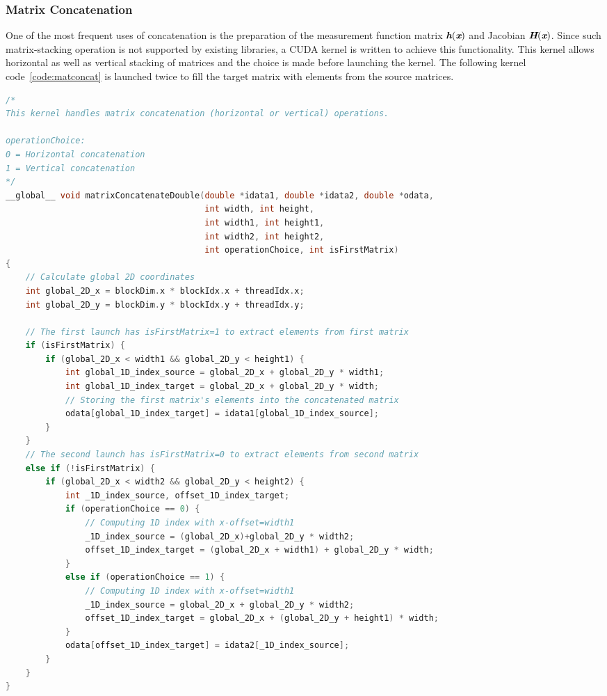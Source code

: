 \documentclass[thesis.tex]{subfiles}
\begin{document}
\subsubsection{Matrix Concatenation}
One of the most frequent uses of concatenation is the preparation of the measurement function matrix $\textit{\textbf{h}}(\textit{\textbf{x}})$ and Jacobian $\textit{\textbf{H}}(\textit{\textbf{x}})$. Since such matrix-stacking operation is not supported by existing libraries, a CUDA kernel is written to achieve this functionality. This kernel allows horizontal as well as vertical stacking of matrices and the choice is made before launching the kernel. The following kernel code~\ref{code:matconcat} is launched twice to fill the target matrix with elements from the source matrices.
\lstset{aboveskip=10pt,belowskip=10pt} %
\begin{lstlisting}[language=C, caption={CUDA kernel for matrix concatenation}, captionpos=b, label={code:matconcat}]
/*
This kernel handles matrix concatenation (horizontal or vertical) operations.

operationChoice:
0 = Horizontal concatenation
1 = Vertical concatenation
*/
__global__ void matrixConcatenateDouble(double *idata1, double *idata2, double *odata, 
										int width, int height, 
										int width1, int height1, 
										int width2, int height2, 
										int operationChoice, int isFirstMatrix)
{
	// Calculate global 2D coordinates
	int global_2D_x = blockDim.x * blockIdx.x + threadIdx.x;
	int global_2D_y = blockDim.y * blockIdx.y + threadIdx.y;
	
	// The first launch has isFirstMatrix=1 to extract elements from first matrix 
	if (isFirstMatrix) {
		if (global_2D_x < width1 && global_2D_y < height1) {
			int global_1D_index_source = global_2D_x + global_2D_y * width1;
			int global_1D_index_target = global_2D_x + global_2D_y * width;
			// Storing the first matrix's elements into the concatenated matrix
			odata[global_1D_index_target] = idata1[global_1D_index_source];
		}
	}
	// The second launch has isFirstMatrix=0 to extract elements from second matrix 
	else if (!isFirstMatrix) {
		if (global_2D_x < width2 && global_2D_y < height2) {
			int _1D_index_source, offset_1D_index_target;
			if (operationChoice == 0) {
				// Computing 1D index with x-offset=width1
				_1D_index_source = (global_2D_x)+global_2D_y * width2;
				offset_1D_index_target = (global_2D_x + width1) + global_2D_y * width;
			}
			else if (operationChoice == 1) {
				// Computing 1D index with x-offset=width1
				_1D_index_source = global_2D_x + global_2D_y * width2;
				offset_1D_index_target = global_2D_x + (global_2D_y + height1) * width;
			}
			odata[offset_1D_index_target] = idata2[_1D_index_source];
		}
	}
}
\end{lstlisting}
\end{document}
